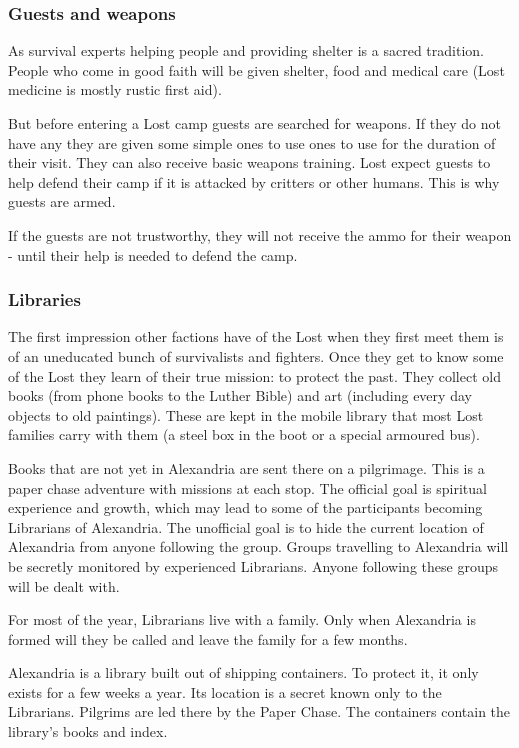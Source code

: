 \subsubsection{Guests and weapons}
\label{sec:Lost guests and weapons}
As survival experts helping people and providing shelter is a sacred tradition. People who come in good faith will be given shelter, food and medical care (Lost medicine is mostly rustic first aid).

But before entering a Lost camp guests are searched for weapons. If they do not have any they are given some simple ones to use ones to use for the duration of their visit. They can also receive basic weapons training. Lost expect guests to help defend their camp if it is attacked by critters or other humans. This is why guests are armed.

If the guests are not trustworthy, they will not receive the ammo for their weapon - until their help is needed to defend the camp.

\subsubsection{Libraries}

The first impression other factions have of the Lost when they first meet them is of an uneducated bunch of survivalists and fighters. Once they get to know some of the Lost they learn of their true mission: to protect the past. They collect old books (from phone books to the Luther Bible) and art (including every day objects to old paintings).
These are kept in the mobile library that most Lost families carry with them (a steel box in the boot or a special armoured bus).

Books that are not yet in Alexandria are sent there on a pilgrimage. This is a paper chase adventure with missions at each stop. The official goal is spiritual experience and growth, which may lead to some of the participants becoming Librarians of Alexandria. The unofficial goal is to hide the current location of Alexandria from anyone following the group.
Groups travelling to Alexandria will be secretly monitored by experienced Librarians. Anyone following these groups will be dealt with.

For most of the year, Librarians live with a family. Only when Alexandria is formed will they be called and leave the family for a few months.

Alexandria is a library built out of shipping containers. To protect it, it only exists for a few weeks a year. Its location is a secret known only to the Librarians. Pilgrims are led there by the Paper Chase. The containers contain the library's books and index.

